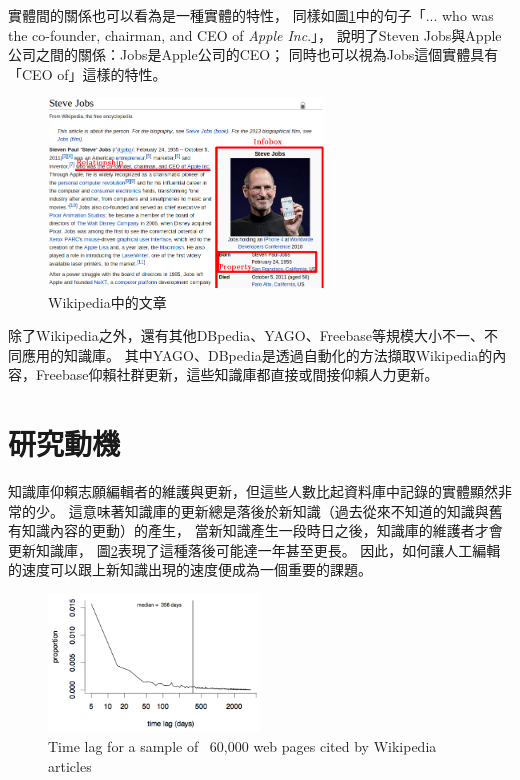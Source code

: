 實體間的關係也可以看為是一種實體的特性，
同樣如圖\ref{i:wiki}中的句子「... who was the co-founder, chairman, and CEO of \emph{Apple Inc}.」，
說明了Steven Jobs與Apple公司之間的關係：Jobs是Apple公司的CEO；
同時也可以視為Jobs這個實體具有「CEO of」這樣的特性。

\begin{figure}
\centering
\includegraphics[width=0.65\textwidth]{images/01-wiki-as-kb}
\caption{Wikipedia中的文章}
\label{i:wiki}
\end{figure}

除了Wikipedia之外，還有其他DBpedia\cite{dbpedia}、YAGO\cite{yago}、Freebase\cite{freebase}等規模大小不一、不同應用的知識庫。
其中YAGO、DBpedia是透過自動化的方法擷取Wikipedia的內容，Freebase仰賴社群更新，這些知識庫都直接或間接仰賴人力更新。  %

%
%
\section{研究動機}
知識庫仰賴志願編輯者的維護與更新，但這些人數比起資料庫中記錄的實體顯然非常的少。
這意味著知識庫的更新總是落後於新知識（過去從來不知道的知識與舊有知識內容的更動）的產生，
當新知識產生一段時日之後，知識庫的維護者才會更新知識庫，
圖\ref{i:wikicitenews}表現了這種落後可能達一年甚至更長。
因此，如何讓人工編輯的速度可以跟上新知識出現的速度便成為一個重要的課題。

\begin{figure}
    \centering
    \includegraphics[width=0.5\textwidth]{images/01-wiki-cite-delay}
    \caption{Time lag for a sample of ~60,000 web pages cited by Wikipedia articles\cite{kba2012} }
    \label{i:wikicitenews}
\end{figure}

